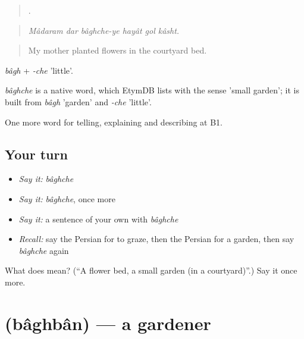 \begin{quote}
     .
\end{quote}

\begin{quote}
\emph{Mâdaram dar bâghche-ye hayât gol kâsht.}
\end{quote}

\begin{quote}
My mother planted flowers in the courtyard bed.
\end{quote}

\emph{bâgh} + \emph{-che} 'little'.

\begin{cousinweb}
\emph{bâghche} is a native word, which EtymDB lists with the sense 'small garden'; it is built from \emph{bâgh} 'garden' and \emph{-che} 'little'.
\end{cousinweb}

\begin{grammarlens}[title={What you've built}]
One more word for telling, explaining and describing at B1.
\end{grammarlens}

\subsection*{Your turn}
\begin{itemize}
\raggedright
  \item \emph{Say it:} \emph{bâghche}
  \item \emph{Say it:} \emph{bâghche}, once more
  \item \emph{Say it:} a sentence of your own with \emph{bâghche}
  \item \emph{Recall:} say the Persian for to graze, then the Persian for a garden, then say \emph{bâghche} again
\end{itemize}

\begin{tcolorbox}[breakable,colback=teal!4,colframe=teal!35!black,title={Before you move on}]
What does  mean? (\textquotedblleft{}A flower bed, a small garden (in a courtyard)\textquotedblright{}.) Say it once more.
\end{tcolorbox}
\section[\texorpdfstring{\fa{باغبان} (bâghbân)}{باغبان (bâghbân)}]{ (bâghbân) — a gardener}

